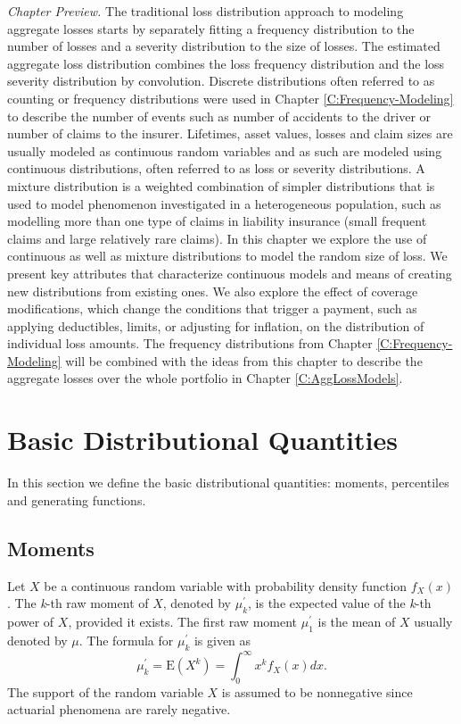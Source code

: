 \documentclass[]{book}
\theoremstyle{definition}
\theoremstyle{definition}
\theoremstyle{definition}
\theoremstyle{remark}
\begin{document}
\emph{Chapter Preview.} The traditional loss distribution approach to
modeling aggregate losses starts by separately fitting a frequency
distribution to the number of losses and a severity distribution to the
size of losses. The estimated aggregate loss distribution combines the
loss frequency distribution and the loss severity distribution by
convolution. Discrete distributions often referred to as counting or
frequency distributions were used in Chapter \ref{C:Frequency-Modeling}
to describe the number of events such as number of accidents to the
driver or number of claims to the insurer. Lifetimes, asset values,
losses and claim sizes are usually modeled as continuous random
variables and as such are modeled using continuous distributions, often
referred to as loss or severity distributions. A mixture distribution is
a weighted combination of simpler distributions that is used to model
phenomenon investigated in a heterogeneous population, such as modelling
more than one type of claims in liability insurance (small frequent
claims and large relatively rare claims). In this chapter we explore the
use of continuous as well as mixture distributions to model the random
size of loss. We present key attributes that characterize continuous
models and means of creating new distributions from existing ones. We
also explore the effect of coverage modifications, which change the
conditions that trigger a payment, such as applying deductibles, limits,
or adjusting for inflation, on the distribution of individual loss
amounts. The frequency distributions from Chapter
\ref{C:Frequency-Modeling} will be combined with the ideas from this
chapter to describe the aggregate losses over the whole portfolio in
Chapter \ref{C:AggLossModels}.

\section{Basic Distributional Quantities}\label{S:BasicQuantities}

In this section we define the basic distributional quantities: moments,
percentiles and generating functions.

\subsection{Moments}\label{moments}

Let \(X\) be a continuous random variable with probability density
function \(f_{X}\left( x \right)\). The \emph{k}-th raw moment of \(X\),
denoted by \(\mu_{k}^{\prime}\), is the expected value of the
\emph{k}-th power of \(X\), provided it exists. The first raw moment
\(\mu_{1}^{\prime}\) is the mean of \(X\) usually denoted by \(\mu\).
The formula for \(\mu_{k}^{\prime}\) is given as
\[\mu_{k}^{\prime} = \mathrm{E}\left( X^{k} \right) = \int_{0}^{\infty}{x^{k}f_{X}\left( x \right)dx } .\]
The support of the random variable \(X\) is assumed to be nonnegative
since actuarial phenomena are rarely negative.
\end{document}
